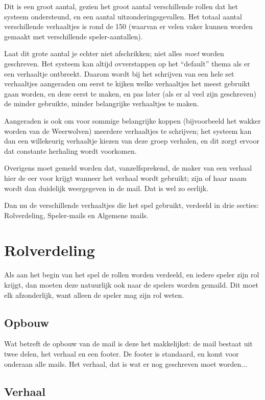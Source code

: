 \documentclass[12pt]{article}
\begin{document}
  Dit is een groot aantal, gezien het groot aantal verschillende rollen dat het systeem ondersteund, en een aantal uitzonderingsgevallen. Het totaal aantal verschillende verhaaltjes is rond de 150 (waarvan er velen vaker kunnen worden gemaakt met verschillende speler-aantallen). 
  
  Laat dit grote aantal je echter niet afschrikken; niet alles \emph{moet} worden geschreven. Het systeem kan altijd ovverstappen op het ``default'' thema als er een verhaaltje ontbreekt. Daarom wordt bij het schrijven van een hele set verhaaltjes aangeraden om eerst te kijken welke verhaaltjes het meest gebruikt gaan worden, en deze eerst te maken, en pas later (als er al veel zijn geschreven) de minder gebruikte, minder belangrijke verhaaltjes te maken.
  
  Aangeraden is ook om voor sommige belangrijke koppen (bijvoorbeeld het wakker worden van de Weerwolven) meerdere verhaaltjes te schrijven; het systeem kan dan een willekeurig verhaaltje kiezen van deze groep verhalen, en dit zorgt ervoor dat constante herhaling wordt voorkomen.
  
  Overigens moet gemeld worden dat, vanzelfsprekend, de maker van een verhaal hier de eer voor krijgt wanneer het verhaal wordt gebruikt; zijn of haar naam wordt dan duidelijk weergegeven in de mail. Dat is wel zo eerlijk.
  
  Dan nu de verschillende verhaaltjes die het spel gebruikt, verdeeld in drie secties: Rolverdeling, Speler-mails en Algemene mails. 
  
\section{Rolverdeling}

  Als aan het begin van het spel de rollen worden verdeeld, en iedere speler zijn rol krijgt, dan moeten deze natuurlijk ook naar de spelers worden gemaild. Dit moet elk afzonderlijk, want alleen de speler mag zijn rol weten. 
  
  \subsection{Opbouw}
  
    Wat betreft de opbouw van de mail is deze het makkelijkst: de mail bestaat uit twee delen, het verhaal en een footer. De footer is standaard, en komt voor onderaan alle mails. Het verhaal, dat is wat er nog geschreven moet worden...
  
  \subsection{Verhaal}
  
\end{document}
